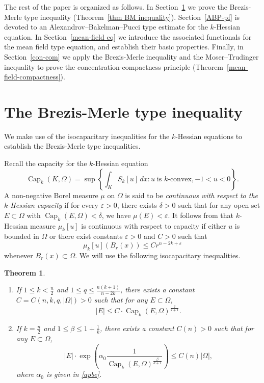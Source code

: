 \documentclass[11pt]{amsart}
\numberwithin{equation}{section}
\newtheorem{theorem}{Theorem}[section]
\numberwithin{equation}{section}
\begin{document}
The rest of the paper is organized as follows.  In Section~\ref{BM-pf} we 
prove the Brezis-Merle type inequality (Theorem~\ref{thm BM inequality}).  
Section~\ref{ABP-pf} is devoted to an Alexandrov--Bakelman--Pucci type 
estimate for the $k$-Hessian equation.  In Section~\ref{mean-field eq} we 
introduce the associated functionals for the mean field type equation, and 
establish their basic properties.  Finally, in Section~\ref{con-com} we 
apply the Brezis-Merle inequality and the 
Moser--Trudinger inequality to prove the concentration‑compactness 
principle (Theorem~\ref{mean-field-compactness}).
\vskip 20pt

\section{The Brezis-Merle type inequality}\label{BM-pf}

We make use of the isocapacitary inequalities for the $k$-Hessian equations to establish the Brezis-Merle type inequalities.

Recall the capacity for the $k$-Hessian equation \cites{TW02, Lab02}
\[
\operatorname{Cap}_{k}(K,\Omega)=\sup\left\{\int_{K}S_k[u]\,dx: u \; \text{is $k$-convex}, -1<u<0\right\}.
\]
A non-negative Borel measure $\mu$ on $\Omega$ is said to be \emph{continuous with respect to the $k$-Hessian capacity} if for every $\varepsilon > 0$, there exists $\delta > 0$ such that for any open set $E \subset \Omega$ with $\operatorname{Cap}_k(E, \Omega) < \delta$, we have $\mu(E) < \varepsilon$.
It follows from \cite{TW02} that $k$-Hessian measure $\mu_k[u]$ is continuous with respect to capacity if either $u$ is bounded in $\Omega$ or there exist constants $\varepsilon>0$ and $C>0$ such that 
\[\mu_k[u](B_r(x)) \le C r^{n-2k+\varepsilon}\]
whenever $B_r(x)\subset\Omega$. We will use the following isocapacitary inequalities.

\begin{theorem}\cite[Theorem 1.2]{XZ14}\label{iso}
	\begin{enumerate}
		\item[(i)] If $1\leq k<\frac{n}{2}$ and $1\leq q \leq \frac{n(k+1)}{n-2k}$, there exists a constant $C=C(n,k,q,|\Omega|)>0$ such that for any $E\subset\Omega$,
		\[
		|E| \leq C\cdot \operatorname{Cap}_k(E,\Omega)^{\frac{q}{k+1}}.
		\]
		
		\item[(ii)] If $k = \frac{n}{2}$ and $1\leq \beta \leq 1+\frac{1}{k}$, there exists a constant $C(n)>0$ such that for any $E\subset\Omega$,
		\[
		|E|\cdot \exp\left(\alpha_0\frac{1}{\operatorname{Cap}_{k}(E,\Omega)^{\frac{\beta}{k+1}}}\right)\leq C(n)|\Omega|,
		\]
		where $\alpha_0$ is given in \eqref{apbe}.
	\end{enumerate}
\end{theorem}
\end{document}
